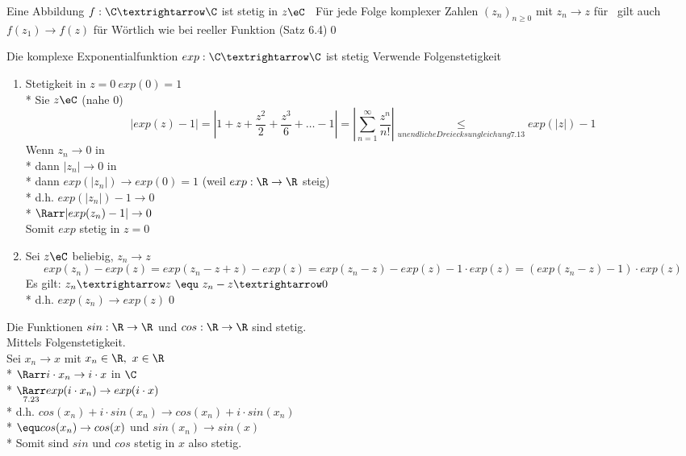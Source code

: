 Eine Abbildung $f:\C→\C$ ist stetig in $z\eC$ \equ\ Für jede Folge komplexer Zahlen $(z_n)_{n\geq 0}$ mit $z_n→z$ für \nif\ gilt auch $f(z_1)→f(z)$ für \nif
\bew
Wörtlich wie bei reeller Funktion (Satz 6.4)\qed

Die komplexe Exponentialfunktion $exp:\C→\C$ ist stetig
\bew
Verwende Folgenstetigkeit
\begin{enumerate}
\item{Stetigkeit in $z=0\ exp (0)=1$\\*
Sie $z\eC$ (nahe 0)
$$\left|exp(z)-1\right|=\left|1+z+\frac{z^2}{2}+\frac{z^3}{6}+…-1\right|=\left|\sum_{n=1}^{∞}\frac{z^n}{n!}\right|\underset{unendliche Dreiecksungleichung 7.13}{\leq}exp(|z|)-1$$
Wenn $z_n→0$ in \C\\*
dann $|z_n|→0$ in \R\\*
dann $exp(|z_n|) \to exp(0) = 1$ (weil $exp: \R \to \R$ steig)\\*
d.h. $exp(|z_n|) -1 \to 0$\\*
$\Rarr|exp(z_n) - 1| \to 0$\\
Somit $exp$ stetig in $z = 0$ }
\item{Sei $z\eC$ beliebig, $z_n→z$
$$exp(z_n)-exp(z)=exp(z_n-z+z)-exp(z)=exp(z_n-z)-exp(z)-1·exp(z)=(exp(z_n-z)-1)·exp(z)$$
Es gilt: $z_n→z\ \equ\ z_n-z→0$\\*
d.h. $exp(z_n)→exp(z)$\qed}
\end{enumerate}

	Die Funktionen $sin: \R \to \R$ und $cos: \R \to \R$ sind stetig.\\
\bew
Mittels Folgenstetigkeit.\\
Sei $x_n \to x$ mit $x_n \in \R,\ x \in \R$\\*
$\Rarr i \cdot x_n \to i \cdot x$ in $\C$\\*
$\underset{{\footnotesize 7.23}}{\Rarr} exp(i \cdot x_n) \to exp(i \cdot x)$\\*
d.h. $cos(x_n) + i \cdot sin(x_n) \to cos(x_n) + i \cdot sin(x_n)$\\*
$\equ cos(x_n) \to cos(x)$ und $sin(x_n) \to sin(x)$\\*
Somit sind $sin$ und $cos$ stetig in $x$ also stetig.